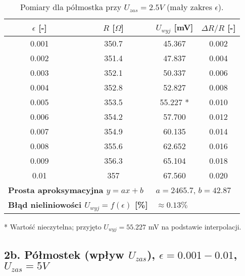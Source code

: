 \documentclass[12pt, a4paper]{article}
\begin{document}
	\begin{table}[H]
		\centering
		\caption{Pomiary dla półmostka przy $U_{zas} = 2.5 V$ (mały zakres $\epsilon$).}
		\begin{tabular}{cccc}
			\toprule
			$\epsilon$ [-] & $R$ [$\Omega$] & $U_{wyj}$ [mV] & $\Delta R/R$ [-] \\
			\midrule
			0.001 & 350.7 & 45.367 & 0.002 \\
			0.002 & 351.4 & 47.837 & 0.004 \\
			0.003 & 352.1 & 50.337 & 0.006 \\
			0.004 & 352.8 & 52.827 & 0.008 \\
			0.005 & 353.5 & 55.227 * & 0.010 \\
			0.006 & 354.2 & 57.700 & 0.012 \\
			0.007 & 354.9 & 60.135 & 0.014 \\
			0.008 & 355.6 & 62.652 & 0.016 \\
			0.009 & 356.3 & 65.104 & 0.018 \\
			0.01 & 357 & 67.560 & 0.020 \\
			\midrule
			\multicolumn{2}{l}{\textbf{Prosta aproksymacyjna $y = ax + b$}} & \multicolumn{2}{l}{$a = 2465.7$, $b = 42.87$} \\
			\multicolumn{2}{l}{\textbf{Błąd nieliniowości $U_{wyj} = f(\epsilon)$ [\%]}} & \multicolumn{2}{l}{$\approx 0.13 \%$} \\
			\bottomrule
		\end{tabular}
		\footnotesize{* Wartość nieczytelna; przyjęto $U_{wyj} = 55.227$ mV na podstawie interpolacji.}
	\end{table}
	
	\subsection{2b. Półmostek (wpływ $U_{zas}$), $\epsilon = 0.001-0.01$, $U_{zas} = 5 V$}
	
\end{document}
